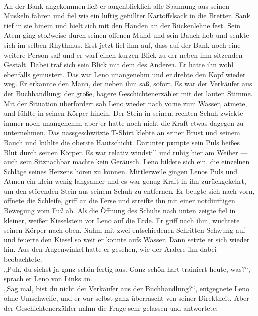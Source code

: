 \documentclass[ngerman,smalldemyvopaper,11pt,oneside,onecolumn,openright,extrafontsizes]{memoir}
\begin{document}
\vspace{0.5em} \\
An der Bank angekommen ließ er augenblicklich alle Spannung aus seinen Muskeln fahren und fiel wie ein luftig gefüllter Kartoffelsack in die Bretter. Sank tief in sie hinein und hielt sich mit den Händen an der Rückenlehne fest. Sein Atem ging stoßweise durch seinen offenen Mund und sein Bauch hob und senkte sich im selben Rhythmus.
Erst jetzt fiel ihm auf, dass auf der Bank noch eine weitere Person saß und er warf einen kurzen Blick zu der neben ihm sitzenden Gestalt. Dabei traf sich sein Blick mit dem des Anderen. Er hatte ihn wohl ebenfalls gemustert. Das war Leno unangenehm und er drehte den Kopf wieder weg. Er erkannte den Mann, der neben ihm saß, sofort. Es war der Verkäufer aus der Buchhandlung; der große, hagere Geschichtenerzähler mit der lauten Stimme.
Mit der Situation überfordert sah Leno wieder nach vorne zum Wasser, atmete, und fühlte in seinen Körper hinein. Der Stein in seinem rechten Schuh zwickte immer noch unangenehm, aber er hatte noch nicht die Kraft etwas dagegen zu unternehmen. Das nassgeschwitzte T-Shirt klebte an seiner Brust und seinem Bauch und kühlte die oberste Hautschicht. Darunter pumpte sein Puls heißes Blut durch seinen Körper. Es war relativ windstill und ruhig hier am Weiher — auch sein Sitznachbar machte kein Geräusch. Leno bildete sich ein, die einzelnen Schläge seines Herzens hören zu können.
Mittlerweile gingen Lenos Puls und Atmen ein klein wenig langsamer und es war genug Kraft in ihn zurückgekehrt, um den störenden Stein aus seinem Schuh zu entfernen. Er beugte sich nach vorn, öffnete die Schleife, griff an die Ferse und streifte ihn mit einer notdürftigen Bewegung vom Fuß ab. Als die Öffnung des Schuhs nach unten zeigte fiel in kleiner, weißer Kieselstein vor Leno auf die Erde. Er griff nach ihm, wuchtete seinen Körper nach oben. Nahm mit zwei entschiedenen Schritten Schwung auf und feuerte den Kiesel so weit er konnte aufs Wasser. Dann setzte er sich wieder hin. Aus den Augenwinkel hatte er gesehen, wie der Andere ihn dabei beobachtete.
\vspace{0.5em} \\
„Puh, du siehst ja ganz schön fertig aus. Ganz schön hart trainiert heute, was?“, sprach er Leno von Links an.
\vspace{0.5em} \\
„Sag mal, bist du nicht der Verkäufer aus der Buchhandlung?“, entgegnete Leno ohne Umschweife, und er war selbst ganz überrascht von seiner Direktheit. Aber der Geschichtenerzähler nahm die Frage sehr gelassen und antwortete:
\end{document}
